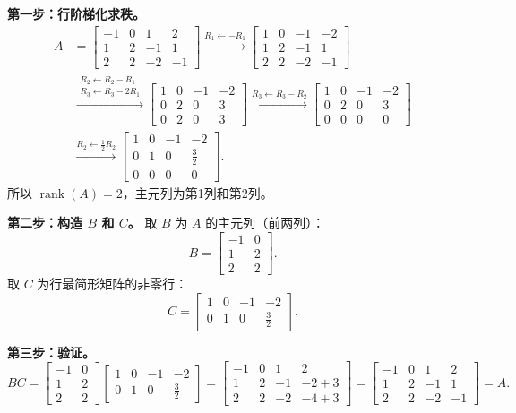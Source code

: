 \documentclass{article}
\begin{document}
\textbf{第一步：行阶梯化求秩。}
\begin{align*}
A &= \begin{bmatrix}
-1 & 0 & 1 & 2\\
1 & 2 & -1 & 1\\
2 & 2 & -2 & -1
\end{bmatrix}
\xrightarrow{R_1\leftarrow -R_1}
\begin{bmatrix}
1 & 0 & -1 & -2\\
1 & 2 & -1 & 1\\
2 & 2 & -2 & -1
\end{bmatrix}\\
&\xrightarrow{\substack{R_2\leftarrow R_2-R_1\\R_3\leftarrow R_3-2R_1}}
\begin{bmatrix}
1 & 0 & -1 & -2\\
0 & 2 & 0 & 3\\
0 & 2 & 0 & 3
\end{bmatrix}
\xrightarrow{R_3\leftarrow R_3-R_2}
\begin{bmatrix}
1 & 0 & -1 & -2\\
0 & 2 & 0 & 3\\
0 & 0 & 0 & 0
\end{bmatrix}\\
&\xrightarrow{R_2\leftarrow \frac12 R_2}
\begin{bmatrix}
1 & 0 & -1 & -2\\
0 & 1 & 0 & \frac32\\
0 & 0 & 0 & 0
\end{bmatrix}.
\end{align*}
所以 $\operatorname{rank}(A)=2$，主元列为第1列和第2列。

\textbf{第二步：构造 $B$ 和 $C$。}
取 $B$ 为 $A$ 的主元列（前两列）：
\[
B = \begin{bmatrix}
-1 & 0\\
1 & 2\\
2 & 2
\end{bmatrix}.
\]
取 $C$ 为行最简形矩阵的非零行：
\[
C = \begin{bmatrix}
1 & 0 & -1 & -2\\
0 & 1 & 0 & \frac32
\end{bmatrix}.
\]

\textbf{第三步：验证。}
\[
BC = \begin{bmatrix}
-1 & 0\\
1 & 2\\
2 & 2
\end{bmatrix}
\begin{bmatrix}
1 & 0 & -1 & -2\\
0 & 1 & 0 & \frac32
\end{bmatrix}
= \begin{bmatrix}
-1 & 0 & 1 & 2\\
1 & 2 & -1 & -2+3\\
2 & 2 & -2 & -4+3
\end{bmatrix}
= \begin{bmatrix}
-1 & 0 & 1 & 2\\
1 & 2 & -1 & 1\\
2 & 2 & -2 & -1
\end{bmatrix}
= A.
\]
\newpage
\end{document}
